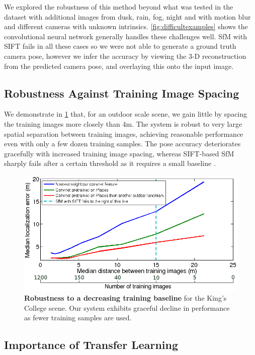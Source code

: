 We explored the robustness of this method beyond what was tested in the dataset with additional images from dusk, rain, fog, night and with motion blur and different cameras with unknown intrinsics. \cref{fig:difficultexamples} shows the convolutional neural network generally handles these challenges well. SfM with SIFT fails in all these cases so we were not able to generate a ground truth camera pose, however we infer the accuracy by viewing the 3-D reconstruction from the predicted camera pose, and overlaying this onto the input image.

\subsection{Robustness Against Training Image Spacing}

We demonstrate in \cref{fig:baseline} that, for an outdoor scale scene, we gain little by spacing the training images more closely than 4m. The system is robust to very large spatial separation between training images, achieving reasonable performance even with only a few dozen training samples. The pose accuracy deteriorates gracefully with increased training image spacing, whereas SIFT-based SfM sharply fails after a certain threshold as it requires a small baseline \citep{lowe2004distinctive}.

\begin{figure}[t]
\begin{center}
   	\includegraphics[width=0.7\linewidth]{ICCV/reduced_baseline}
\end{center}
   \caption[Robustness to a decreasing training baseline.]{\textbf{Robustness to a decreasing training baseline} for the King's College scene. Our system exhibits graceful decline in performance as fewer training samples are used.}
\label{fig:baseline}
\end{figure}

\subsection{Importance of Transfer Learning}

